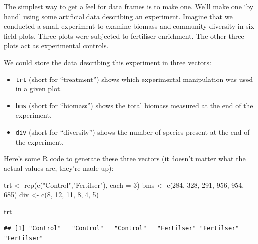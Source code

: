 \documentclass[
]{book}
\newenvironment{Shaded}{\begin{snugshade}}{\end{snugshade}}
\newcommand{\AttributeTok}[1]{\textcolor[rgb]{0.77,0.63,0.00}{#1}}
\newcommand{\DecValTok}[1]{\textcolor[rgb]{0.00,0.00,0.81}{#1}}
\newcommand{\FunctionTok}[1]{\textcolor[rgb]{0.00,0.00,0.00}{#1}}
\newcommand{\NormalTok}[1]{#1}
\newcommand{\OtherTok}[1]{\textcolor[rgb]{0.56,0.35,0.01}{#1}}
\newcommand{\StringTok}[1]{\textcolor[rgb]{0.31,0.60,0.02}{#1}}
\providecommand{\tightlist}{%
  \setlength{\itemsep}{0pt}\setlength{\parskip}{0pt}}
\begin{document}
The simplest way to get a feel for data frames is to make one. We'll make one `by hand' using some artificial data describing an experiment. Imagine that we conducted a small experiment to examine biomass and community diversity in six field plots. Three plots were subjected to fertiliser enrichment. The other three plots act as experimental controls.

We could store the data describing this experiment in three vectors:

\begin{itemize}
\tightlist
\item
  \texttt{trt} (short for ``treatment'') shows which experimental manipulation was used in a given plot.
\item
  \texttt{bms} (short for ``biomass'') shows the total biomass measured at the end of the experiment.
\item
  \texttt{div} (short for ``diversity'') shows the number of species present at the end of the experiment.
\end{itemize}

Here's some R code to generate these three vectors (it doesn't matter what the actual values are, they're made up):

\begin{Shaded}
\begin{Highlighting}[]
\NormalTok{trt }\OtherTok{\textless{}{-}} \FunctionTok{rep}\NormalTok{(}\FunctionTok{c}\NormalTok{(}\StringTok{"Control"}\NormalTok{,}\StringTok{"Fertilser"}\NormalTok{), }\AttributeTok{each =} \DecValTok{3}\NormalTok{) }
\NormalTok{bms }\OtherTok{\textless{}{-}} \FunctionTok{c}\NormalTok{(}\DecValTok{284}\NormalTok{, }\DecValTok{328}\NormalTok{, }\DecValTok{291}\NormalTok{, }\DecValTok{956}\NormalTok{, }\DecValTok{954}\NormalTok{, }\DecValTok{685}\NormalTok{)}
\NormalTok{div }\OtherTok{\textless{}{-}} \FunctionTok{c}\NormalTok{(}\DecValTok{8}\NormalTok{, }\DecValTok{12}\NormalTok{, }\DecValTok{11}\NormalTok{, }\DecValTok{8}\NormalTok{, }\DecValTok{4}\NormalTok{, }\DecValTok{5}\NormalTok{)}
\end{Highlighting}
\end{Shaded}

\begin{Shaded}
\begin{Highlighting}[]
\NormalTok{trt}
\end{Highlighting}
\end{Shaded}

\begin{verbatim}
## [1] "Control"   "Control"   "Control"   "Fertilser" "Fertilser" "Fertilser"
\end{verbatim}
\end{document}
